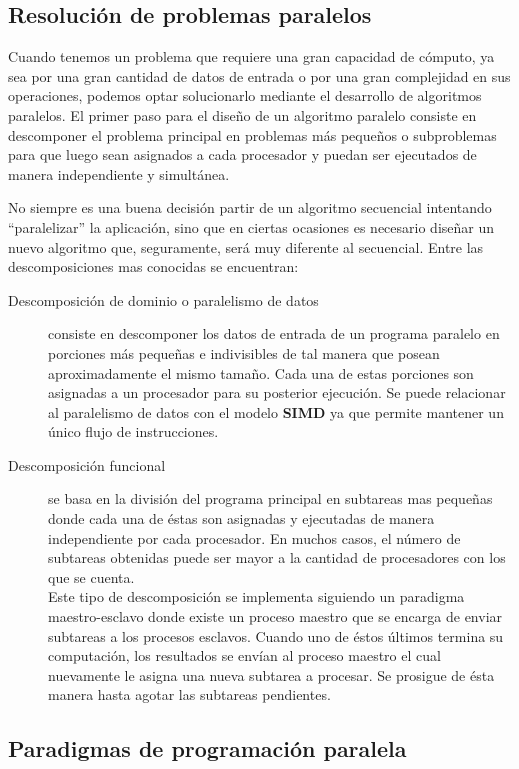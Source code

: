 \subsection{Resolución de problemas paralelos}

Cuando tenemos un problema que requiere una gran capacidad de cómputo, ya sea por una gran cantidad de datos de entrada o por una gran
complejidad en sus operaciones, podemos optar solucionarlo mediante el desarrollo de algoritmos paralelos. El primer paso para el diseño de
un algoritmo paralelo consiste en descomponer el problema principal en problemas más pequeños o subproblemas para que luego sean asignados a
cada procesador y puedan ser ejecutados de manera independiente y simultánea.

No siempre es una buena decisión partir de un algoritmo secuencial intentando ``paralelizar'' la aplicación, sino que en ciertas ocasiones
es necesario diseñar un nuevo algoritmo que, seguramente, será muy diferente al secuencial.
Entre las descomposiciones mas conocidas se encuentran:

    \begin{description}
     \item[Descomposición de dominio o paralelismo de datos] consiste en descomponer los datos de entrada de
un programa paralelo en porciones más pequeñas e indivisibles de tal manera que posean aproximadamente el mismo tamaño. Cada una de estas
porciones son asignadas a un procesador para su posterior ejecución. Se puede relacionar al paralelismo de datos con el modelo \textbf{SIMD}
ya que permite mantener un único flujo de instrucciones.
     \item[Descomposición funcional] se basa en la división del programa principal en subtareas mas pequeñas donde cada una de éstas son
asignadas y ejecutadas de manera independiente por cada procesador. En muchos casos, el número de subtareas obtenidas puede ser mayor a la
cantidad de procesadores con los que se cuenta. \\
Este tipo de descomposición se implementa siguiendo un paradigma maestro-esclavo donde existe un proceso maestro que se encarga de enviar
subtareas a los procesos  esclavos. Cuando uno de éstos últimos termina su computación, los resultados se envían al proceso maestro el cual
nuevamente le asigna una nueva subtarea a procesar. Se prosigue de ésta manera hasta agotar las subtareas pendientes.
    \end{description}

\subsection{Paradigmas de programación paralela}

